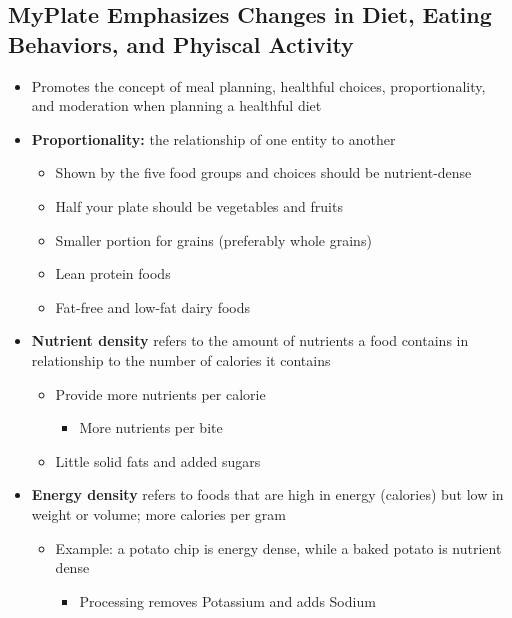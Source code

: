 \documentclass[12pt]{article}
\begin{document}
        \subsection{MyPlate Emphasizes Changes in Diet, Eating Behaviors, and Phyiscal Activity}
            \begin{itemize}
                \item Promotes the concept of meal planning, healthful choices, proportionality, and moderation when planning a healthful diet
                \item \textbf{Proportionality:} the relationship of one entity to another
                    \begin{itemize}
                        \item Shown by the five food groups and choices should be nutrient-dense
                        \item Half your plate should be vegetables and fruits
                        \item Smaller portion for grains (preferably whole grains)
                        \item Lean protein foods
                        \item Fat-free and low-fat dairy foods
                    \end{itemize}
                \item \textbf{Nutrient density} refers to the amount of nutrients a food contains in relationship to the number of calories it contains
                    \begin{itemize}
                        \item Provide more nutrients per calorie
                            \begin{itemize}
                                \item More nutrients per bite
                            \end{itemize}
                        \item Little solid fats and added sugars
                    \end{itemize}
                \item \textbf{Energy density} refers to foods that are high in energy (calories) but low in weight or volume; more calories per gram
                    \begin{itemize}
                        \item Example: a potato chip is energy dense, while a baked potato is nutrient dense
                            \begin{itemize}
                                \item Processing removes Potassium and adds Sodium
                            \end{itemize}
                    \end{itemize}
            \end{itemize}
\end{document}
